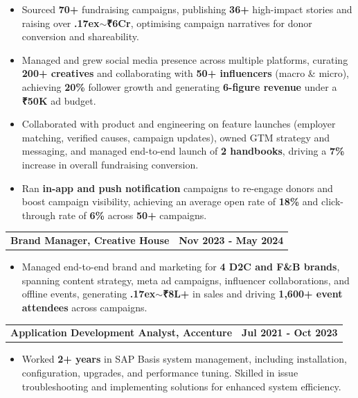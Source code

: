 \documentclass[9.5pt, a4paper]{article}
\begin{document}
\begin{itemize}
  \item Sourced \textbf{70+} fundraising campaigns, publishing \textbf{36+} high-impact stories and raising over \textbf{{\raise.17ex\hbox{$\scriptstyle\sim$}}₹6Cr}, optimising campaign narratives for donor conversion and shareability.
  \item Managed and grew social media presence across multiple platforms, curating \textbf{200+ creatives} and collaborating with \textbf{50+ influencers} (macro \& micro), achieving \textbf{20\%} follower growth and generating \textbf{6-figure revenue} under a \textbf{₹50K} ad budget.
  \item Collaborated with product and engineering on feature launches (employer matching, verified causes, campaign updates), owned GTM strategy and messaging, and managed end-to-end launch of \textbf{2 handbooks}, driving a \textbf{7\%} increase in overall fundraising conversion.
  \item Ran \textbf{in-app and push notification} campaigns to re-engage donors and boost campaign visibility, achieving an average open rate of \textbf{18\%} and click-through rate of \textbf{6\%} across \textbf{50+} campaigns.
\end{itemize}

\vspace{1pt}
\begin{tabularx}{\textwidth}{@{}X r@{}}
  \textbf{Brand Manager, Creative House} &
  \textbf{Nov 2023 - May 2024}
\end{tabularx}

\begin{itemize}
  \item Managed end-to-end brand and marketing for \textbf{4 D2C and F\&B brands}, spanning content strategy, meta ad campaigns, influencer collaborations, and offline events, generating \textbf{{\raise.17ex\hbox{$\scriptstyle\sim$}}₹8L+} in sales and driving \textbf{1,600+ event attendees} across campaigns.
\end{itemize}

\vspace{1pt}
\begin{tabularx}{\textwidth}{@{}X r@{}}
  \textbf{Application Development Analyst, Accenture} &
  \textbf{Jul 2021 - Oct 2023}
\end{tabularx}

\begin{itemize}
  \item Worked \textbf{2+ years} in SAP Basis system management, including installation, configuration, upgrades, and performance tuning. Skilled in issue troubleshooting and implementing solutions for enhanced system efficiency.
\end{itemize}
\end{document}
